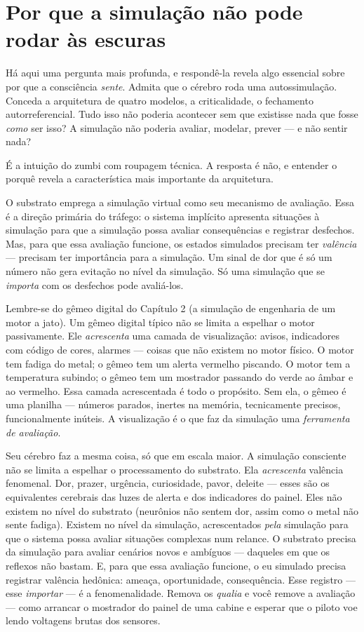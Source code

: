 \documentclass[11pt, twoside, openright]{book}
\begin{document}
\section*{Por que a simulação não pode rodar às escuras}

Há aqui uma pergunta mais profunda, e respondê-la revela algo essencial sobre por que a consciência \textit{sente}. Admita que o cérebro roda uma autossimulação. Conceda a arquitetura de quatro modelos, a criticalidade, o fechamento autorreferencial. Tudo isso não poderia acontecer sem que existisse nada que fosse \textit{como} ser isso? A simulação não poderia avaliar, modelar, prever --- e não sentir nada?

É a intuição do zumbi com roupagem técnica. A resposta é não, e entender o porquê revela a característica mais importante da arquitetura.

O substrato emprega a simulação virtual como seu mecanismo de avaliação. Essa é a direção primária do tráfego: o sistema implícito apresenta situações à simulação para que a simulação possa avaliar consequências e registrar desfechos. Mas, para que essa avaliação funcione, os estados simulados precisam ter \textit{valência} --- precisam ter importância para a simulação. Um sinal de dor que é só um número não gera evitação no nível da simulação. Só uma simulação que se \textit{importa} com os desfechos pode avaliá-los.

Lembre-se do gêmeo digital do Capítulo 2 (a simulação de engenharia de um motor a jato). Um gêmeo digital típico não se limita a espelhar o motor passivamente. Ele \textit{acrescenta} uma camada de visualização: avisos, indicadores com código de cores, alarmes --- coisas que não existem no motor físico. O motor tem fadiga do metal; o gêmeo tem um alerta vermelho piscando. O motor tem a temperatura subindo; o gêmeo tem um mostrador passando do verde ao âmbar e ao vermelho. Essa camada acrescentada é todo o propósito. Sem ela, o gêmeo é uma planilha --- números parados, inertes na memória, tecnicamente precisos, funcionalmente inúteis. A visualização é o que faz da simulação uma \textit{ferramenta de avaliação}.

Seu cérebro faz a mesma coisa, só que em escala maior. A simulação consciente não se limita a espelhar o processamento do substrato. Ela \textit{acrescenta} valência fenomenal. Dor, prazer, urgência, curiosidade, pavor, deleite --- esses são os equivalentes cerebrais das luzes de alerta e dos indicadores do painel. Eles não existem no nível do substrato (neurônios não sentem dor, assim como o metal não sente fadiga). Existem no nível da simulação, acrescentados \textit{pela} simulação para que o sistema possa avaliar situações complexas num relance. O substrato precisa da simulação para avaliar cenários novos e ambíguos --- daqueles em que os reflexos não bastam. E, para que essa avaliação funcione, o eu simulado precisa registrar valência hedônica: ameaça, oportunidade, consequência. Esse registro --- esse \textit{importar} --- é a fenomenalidade. Remova os \textit{qualia} e você remove a avaliação --- como arrancar o mostrador do painel de uma cabine e esperar que o piloto voe lendo voltagens brutas dos sensores.
\end{document}
